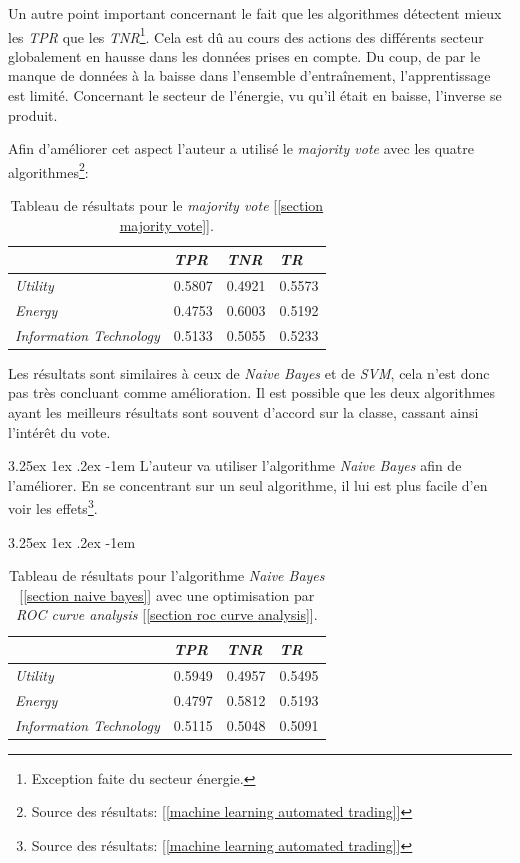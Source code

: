 \documentclass[a4paper, 11pt]{article}
\makeatletter
\renewcommand\paragraph{\@startsection{paragraph}{5}{\z@}%
  {3.25ex \@plus1ex \@minus.2ex}%
  {-1em}%
  {\normalfont\normalsize\bfseries}}
\makeatother
\begin{document}
Un autre point important concernant le fait que les algorithmes détectent mieux les \textit{TPR} que les \textit{TNR}\footnote{Exception faite du secteur énergie.}. Cela est dû au cours des actions des différents secteur globalement en hausse dans les données prises en compte. Du coup, de par le manque de données à la baisse dans l'ensemble d'entraînement, l'apprentissage est limité. Concernant le secteur de l'énergie, vu qu'il était en baisse, l'inverse se produit.

Afin d'améliorer cet aspect l'auteur a utilisé le \textit{majority vote} avec les quatre algorithmes\footnote{Source des résultats: [\ref{machine learning automated trading}]}:

\begin{table}[h!]
	\centering
\begin{tabular}{|l|l|l|l|}
	\hline
	\ & \textit{TPR} & \textit{TNR} & \textit{TR}\\
	\hline
	\textit{Utility} & 0.5807 & 0.4921 & 0.5573 \\
	\hline
	\textit{Energy} & 0.4753 & 0.6003 & 0.5192\\
	\hline
	\textit{Information Technology} & 0.5133 & 0.5055 & 0.5233\\
	\hline
\end{tabular}
\caption{Tableau de résultats pour le \textit{majority vote} [\ref{section majority vote}].}
\end{table}

Les résultats sont similaires à ceux de \textit{Naive Bayes} et de \textit{SVM}, cela n'est donc pas très concluant comme amélioration. Il est possible que les deux algorithmes ayant les meilleurs résultats sont souvent d'accord sur la classe, cassant ainsi l'intérêt du vote.

\paragraph{}
L'auteur va utiliser l'algorithme \textit{Naive Bayes} afin de l'améliorer. En se concentrant sur un seul algorithme, il lui est plus facile d'en voir les effets\footnote{Source des résultats: [\ref{machine learning automated trading}]}.

\paragraph{}
\begin{table}[h!]
	\centering
\begin{tabular}{|l|l|l|l|}
	\hline
	\ & \textit{TPR} & \textit{TNR} & \textit{TR}\\
	\hline
	\textit{Utility} & 0.5949 & 0.4957 & 0.5495 \\
	\hline
	\textit{Energy} & 0.4797 & 0.5812 & 0.5193\\
	\hline
	\textit{Information Technology} & 0.5115 & 0.5048 & 0.5091\\
	\hline
\end{tabular}
\caption{Tableau de résultats pour l'algorithme \textit{Naive Bayes} [\ref{section naive bayes}] avec une optimisation par \textit{ROC curve analysis} [\ref{section roc curve analysis}].}
\end{table}
\end{document}
